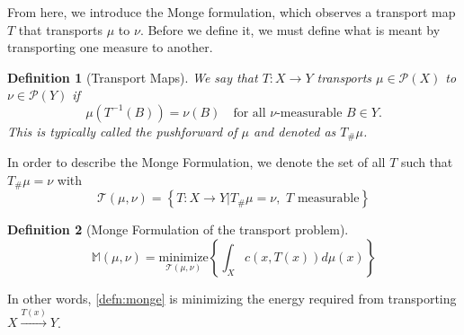 \documentclass[12pt]{article}
\theoremstyle{plain}
\newtheorem{defn}{Definition}[section]
\numberwithin{equation}{section}
\begin{document}
From here, we introduce
the Monge formulation, which observes a transport map $T$ that transports $\mu$ to $\nu$. Before we define it, we must define what is meant by transporting one measure to another.
\begin{defn}[Transport Maps]\label{defn:transport_map}
  We say that $T: X\to Y$ transports $\mu\in \mathcal{P}(X)$ to $\nu\in\mathcal{P}(Y)$ if 
  \begin{equation*}\label{eqn:pushforward}
    \mu(T^{-1}(B)) = \nu(B) \quad\text{for all $\nu$-measurable $B\in Y$.}
  \end{equation*}
  This is typically called the \textit{pushforward} of $\mu$ and denoted as $T_\#\mu$.
\end{defn} 
In order to describe the Monge Formulation, we denote the set of all $T$ such that $T_\#\mu=\nu$ with
\begin{equation}
  \mathcal{T}(\mu,\nu) = \left\{T: X\to Y \vert T_\#\mu = \nu,\,\,\text{$T$ measurable} \right\}
\end{equation}
\begin{defn}[Monge Formulation of the transport problem]\label{defn:monge}
  \begin{equation}
    \mathbb{M}(\mu,\nu) = \underset{\mathcal{T}(\mu,\nu)}{\text{minimize}}\left\{\int_X c(x,T(x))d\mu(x)\right\}
  \end{equation}
\end{defn}
In other words, \autoref{defn:monge} is minimizing the energy required from transporting $X\overset{T(x)}{\to}Y$. 
\end{document}

